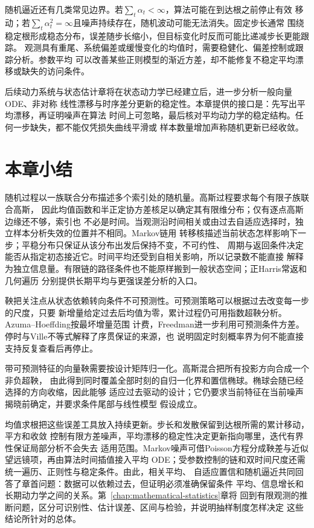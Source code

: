 随机逼近还有几类常见边界。若$\sum_t\alpha_t<\infty$，算法可能在到达根之前停止有效
移动；若$\sum_t\alpha_t^2=\infty$且噪声持续存在，随机波动可能无法消失。固定步长通常
围绕稳定根形成稳态分布，误差随步长缩小，但目标变化时反而可能比递减步长更能跟踪。
观测具有重尾、系统偏差或缓慢变化的均值时，需要稳健化、偏差控制或跟踪分析。参数平均
可以改善某些正则模型的渐近方差，却不能修复不稳定平均漂移或缺失的访问条件。

后续动力系统与状态估计章将在状态动力学已经建立后，进一步分析一般向量ODE、非对称
线性漂移与时序差分更新的稳定性。本章提供的接口是：先写出平均漂移，再证明噪声在算法
时间上可忽略，最后核对平均动力学的稳定结构。任何一步缺失，都不能仅凭损失曲线平滑或
样本数量增加声称随机更新已经收敛。

\section{本章小结}
\label{sec:stochastic-processes-and-approximation-summary}

随机过程以一族联合分布描述多个索引处的随机量。高斯过程要求每个有限子族联合高斯，
因此均值函数和半正定协方差核足以确定其有限维分布；仅有逐点高斯边缘还不够，索引也
不必是时间。当观测沿时间相关或由过去自适应选择时，独立样本分析失效的位置并不相同。Markov链用
转移核描述当前状态怎样影响下一步；平稳分布只保证从该分布出发后保持不变，不可约性、
周期与返回条件决定能否从指定初态接近它。时间平均还受到自相关影响，所以记录数不能直接
解释为独立信息量。有限链的路径条件也不能原样搬到一般状态空间；正Harris常返和几何遍历
分别提供长期平均与更强误差分析的入口。

鞅把关注点从状态依赖转向条件不可预测性。可预测策略可以根据过去改变每一步的尺度，只要
新增量给定过去后均值为零，累计过程仍可用指数超鞅分析。Azuma--Hoeffding按最坏增量范围
计费，Freedman进一步利用可预测条件方差。停时与Ville不等式解释了序贯保证的来源，也
说明固定时刻概率界为何不能直接支持反复查看后再停止。

带可预测特征的向量鞅需要按设计矩阵归一化。高斯混合把所有投影方向合成一个非负超鞅，
由此得到同时覆盖全部时刻的自归一化界和置信椭球。椭球会随已经选择的方向收缩，因此能够
适应过去驱动的设计；它仍要求当前特征在当前噪声揭晓前确定，并要求条件尾部与线性模型
假设成立。

均值求根把这些误差工具放入持续更新。步长和发散保留到达根所需的累计移动，平方和收敛
控制有限方差噪声，平均漂移的稳定性决定更新指向哪里，迭代有界性保证局部分析不会失去
适用范围。Markov噪声可借Poisson方程分成鞅差与近似望远镜项，再由算法时间插值接入平均
ODE；受参数控制的链和双时间尺度还需统一遍历、正则性与稳定条件。由此，相关平均、
自适应置信和随机逼近共同回答了章首问题：数据可以依赖过去，但证明必须准确保留条件
平均、信息增长和长期动力学之间的关系。第~\ref{chap:mathematical-statistics}章将
回到有限观测的推断问题，区分可识别性、估计误差、区间与检验，并说明抽样制度怎样决定
这些结论所针对的总体。
